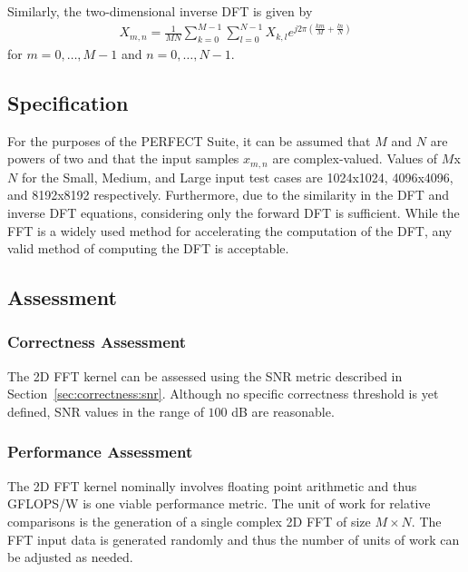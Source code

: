 \documentclass{report}
\begin{document}
Similarly, the two-dimensional inverse DFT is given by
\begin{align}
    X_{m,n} = \frac{1}{MN} \sum_{k=0}^{M-1} \sum_{l=0}^{N-1} X_{k,l} e^{j2\pi \left(\frac{km}{M} + \frac{ln}{N}\right)}
\end{align}
for $m = 0, \ldots, M-1$ and $n = 0, \ldots, N-1$.

\subsection{Specification}

For the purposes of the PERFECT Suite, it can be assumed that
$M$ and $N$ are powers of two and that the input samples $x_{m,n}$ are
complex-valued.
Values of $M$x$N$ for the Small, Medium, and Large input test cases are
1024x1024, 4096x4096, and 8192x8192 respectively.
Furthermore, due to the similarity in the DFT and inverse DFT equations,
considering only the forward DFT is sufficient.
While the FFT is a widely used method for accelerating the computation of the DFT,
any valid method of computing the DFT is acceptable.

\subsection{Assessment}

\subsubsection{Correctness Assessment}

The 2D FFT kernel can be assessed using the SNR metric described
in Section~\ref{sec:correctness:snr}.
Although no specific correctness threshold is yet defined, SNR values in the
range of $100$ dB are reasonable.

\subsubsection{Performance Assessment}

The 2D FFT kernel nominally involves floating point arithmetic and thus
GFLOPS/W is one viable performance metric.
The unit of work for relative comparisons is the generation of a single complex
2D FFT of size $M \times N$.
The FFT input data is generated randomly and thus the number of units of work
can be adjusted as needed.

\end{document}
